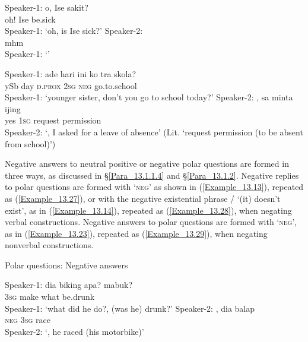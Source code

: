 \ea
\label{Example_13.25}
\ea
\label{Example_13.25a}
\gll Speaker-1:  o,  Ise  sakit?\\ %
 {}   oh!  Ise  be.sick\\
\glt Speaker-1: ‘oh, is Ise sick?’
\vspace{10pt}
\ex
\label{Example_25b}
\gll    Speaker-2:  \\
 {}    mhm\\
\glt Speaker-1: ‘’ \textstyleExampleSource{[080919-006-CvNP.0030-0031]}
\z
\z

\ea
\label{Example_13.26}
\ea
\label{Example_13.26a}
\gll Speaker-1:  ade  hari  ini  ko  tra  skola?\\ %
 {}    ySb  day  \textsc{d.prox}  \textsc{2sg}  \textsc{neg}  go.to.school\\
\glt Speaker-1: ‘younger sister, don’t you go to school today?’
\vspace{10pt}
\ex
\label{Example_13.26b}
\gll  Speaker-2:  ,  sa  minta  ijing\\
  {}   yes  \textsc{1sg}  request  permission\\
\glt Speaker-2: ‘, I asked for a leave of absence’ (Lit. ‘request permission (to be absent from school)’) \textstyleExampleSource{[080922-001a-CvPh.0093-0094]}
\z
\z

Negative answers to neutral positive or negative polar questions are formed in three ways, as discussed in §\ref{Para_13.1.1.4} and §\ref{Para_13.1.2}. Negative replies to polar questions are formed with  ‘\textsc{neg}’ as shown in (\ref{Example_13.13}), repeated as (\ref{Example_13.27}), or with the negative existential phrase / ‘(it) doesn’t exist’, as in (\ref{Example_13.14}), repeated as (\ref{Example_13.28}), when negating verbal constructions. Negative answers to polar questions are formed with  ‘\textsc{neg}’, as in (\ref{Example_13.23}), repeated as (\ref{Example_13.29}), when negating nonverbal constructions.


\begin{styleExampleTitle}
Polar questions: Negative answers
\end{styleExampleTitle}

\ea
\label{Example_13.27}
\ea
\label{Example_13.27a}
\gll Speaker-1:  dia  biking  apa?  mabuk?\\ %
 {}   \textsc{3sg}  make  what  be.drunk\\
 Speaker-1: ‘what did he do?, (was he) drunk?’
\vspace{10pt}
\ex
\label{Example_13.27b}
\gll    Speaker-2:  ,  dia  balap\\
  {}   \textsc{neg}  \textsc{3sg}  race\\
\glt Speaker-2: ‘, he raced (his motorbike)’ \textstyleExampleSource{[081014-013-NP.0003-0004]}
\z
\z

